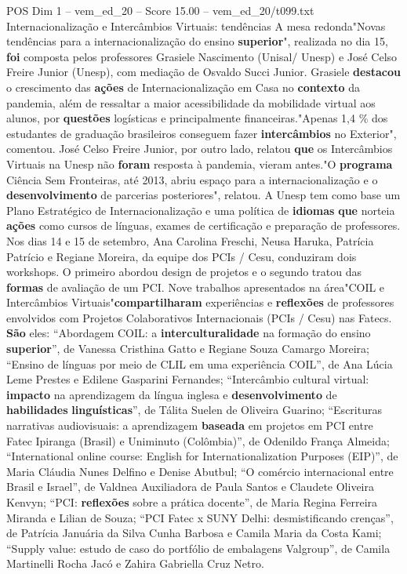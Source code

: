 \begin{textsample}{POS Dim 1 – vem\_ed\_20 – Score 15.00 – vem\_ed\_20/t099.txt}  \label{ex:f1_pos_107}
Internacionalização e Intercâmbios Virtuais: tendências A mesa redonda"Novas tendências para a internacionalização do ensino \textbf{superior}", realizada no dia 15, \textbf{foi} composta pelos professores Grasiele Nascimento (Unisal/ Unesp) e José Celso Freire Junior (Unesp), com mediação de Osvaldo Succi Junior.
Grasiele \textbf{destacou} o crescimento das \textbf{ações} de Internacionalização em Casa no \textbf{contexto} da pandemia, além de ressaltar a maior acessibilidade da mobilidade virtual aos alunos, por \textbf{questões} logísticas e principalmente financeiras."Apenas 1,4 \% dos estudantes de graduação brasileiros conseguem fazer \textbf{intercâmbios} no Exterior", comentou.
José Celso Freire Junior, por outro lado, relatou \textbf{que} os Intercâmbios Virtuais na Unesp não \textbf{foram} resposta à pandemia, vieram antes."O \textbf{programa} Ciência Sem Fronteiras, até 2013, abriu espaço para a internacionalização e o \textbf{desenvolvimento} de parcerias posteriores", relatou.
A Unesp tem como base um Plano Estratégico de Internacionalização e uma política de \textbf{idiomas} \textbf{que} norteia \textbf{ações} como cursos de línguas, exames de certificação e preparação de professores.
Nos dias 14 e 15 de setembro, Ana Carolina Freschi, Neusa Haruka, Patrícia Patrício e Regiane Moreira, da equipe dos PCIs / Cesu, conduziram dois workshops.
O primeiro abordou design de projetos e o segundo tratou das \textbf{formas} de avaliação de um PCI.
Nove trabalhos apresentados na área"COIL e Intercâmbios Virtuais"\textbf{compartilharam} experiências e \textbf{reflexões} de professores envolvidos com Projetos Colaborativos Internacionais (PCIs / Cesu) nas Fatecs. \textbf{São} eles: “Abordagem COIL: a \textbf{interculturalidade} na formação do ensino \textbf{superior}”, de Vanessa Cristhina Gatto e Regiane Souza Camargo Moreira; “Ensino de línguas por meio de CLIL em uma experiência COIL”, de Ana Lúcia Leme Prestes e Edilene Gasparini Fernandes; “Intercâmbio cultural virtual: \textbf{impacto} na aprendizagem da língua inglesa e \textbf{desenvolvimento} de \textbf{habilidades} \textbf{linguísticas}”, de Tálita Suelen de Oliveira Guarino; “Escrituras narrativas audiovisuais: a aprendizagem \textbf{baseada} em projetos em PCI entre Fatec Ipiranga (Brasil) e Uniminuto (Colômbia)”, de Odenildo França Almeida; “International online course: English for Internationalization Purposes (EIP)”, de Maria Cláudia Nunes Delfino e Denise Abutbul; “O comércio internacional entre Brasil e Israel”, de Valdnea Auxiliadora de Paula Santos e Claudete Oliveira Kenvyn; “PCI: \textbf{reflexões} sobre a prática docente”, de Maria Regina Ferreira Miranda e Lilian de Souza; “PCI Fatec x SUNY Delhi: desmistificando crenças”, de Patrícia Januária da Silva Cunha Barbosa e Camila Maria da Costa Kami; “Supply value: estudo de caso do portfólio de embalagens Valgroup”, de Camila Martinelli Rocha Jacó e Zahira Gabriella Cruz Netro.

\end{textsample}

